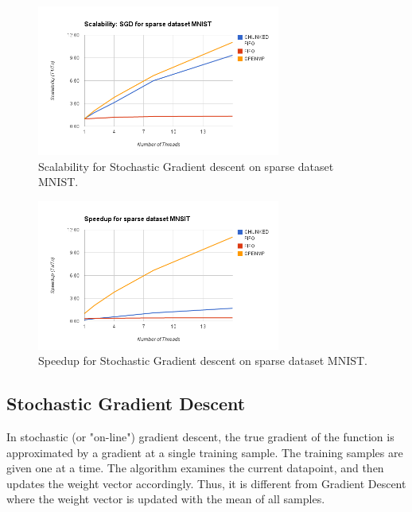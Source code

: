 \documentclass{sigplanconf}
\begin{document}
\begin{figure}[ht!]
\centering
\includegraphics[width=80mm]{sgd_scale_sparse.png}
\caption{Scalability for Stochastic Gradient descent on sparse dataset MNIST. }
\label{overflow}
\end{figure}


\begin{figure}[ht!]
\centering
\includegraphics[width=80mm]{sgd_speed_sparse.png}
\caption{Speedup for Stochastic Gradient descent on sparse dataset MNIST. }
\label{overflow}
\end{figure}




\subsection{Stochastic Gradient Descent}
In stochastic (or "on-line") gradient descent, the true gradient of the function is approximated by a gradient at a
single training sample. The training samples are given one at a time. The algorithm examines the
current datapoint, and then updates the weight vector accordingly. Thus, it is different from Gradient Descent where the weight
vector is updated with the mean of all samples.
\end{document}
